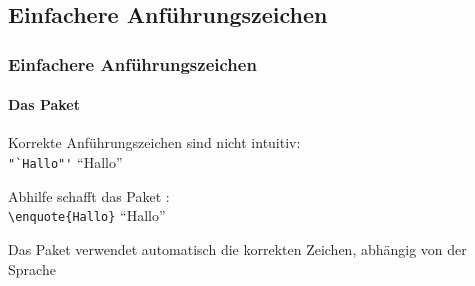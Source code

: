 \subsection{Einfachere Anführungszeichen}

\begin{frame}[fragile]
    \frametitle{Einfachere Anführungszeichen}
    \framesubtitle{Das Paket }
    
    Korrekte Anführungszeichen sind nicht intuitiv:\\
    \verb+"`Hallo"'+ \textrightarrow{} "`Hallo"'
    
    \bigskip\pause
    Abhilfe schafft das Paket :\\
    \verb+\enquote{Hallo}+ \textrightarrow{} \enquote{Hallo}
    
    \bigskip
    Das Paket verwendet automatisch die korrekten Zeichen, abhängig von der Sprache
\end{frame}